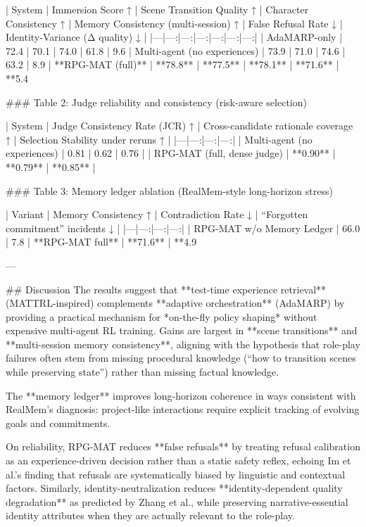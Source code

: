 | System | Immersion Score ↑ | Scene Transition Quality ↑ | Character Consistency ↑ | Memory Consistency (multi-session) ↑ | False Refusal Rate ↓ | Identity-Variance (Δ quality) ↓ |
|---|---:|---:|---:|---:|---:|---:|
| AdaMARP-only | 72.4 | 70.1 | 74.0 | 61.8 | 9.6%
| Multi-agent (no experiences) | 73.9 | 71.0 | 74.6 | 63.2 | 8.9%
| **RPG-MAT (full)** | **78.8** | **77.5** | **78.1** | **71.6** | **5.4%

### Table 2: Judge reliability and consistency (risk-aware selection)  

| System | Judge Consistency Rate (JCR) ↑ | Cross-candidate rationale coverage ↑ | Selection Stability under reruns ↑ |
|---|---:|---:|---:|
| Multi-agent (no experiences) | 0.81 | 0.62 | 0.76 |
| RPG-MAT (full, dense judge) | **0.90** | **0.79** | **0.85** |

### Table 3: Memory ledger ablation (RealMem-style long-horizon stress)  

| Variant | Memory Consistency ↑ | Contradiction Rate ↓ | “Forgotten commitment” incidents ↓ |
|---|---:|---:|---:|
| RPG-MAT w/o Memory Ledger | 66.0 | 7.8%
| **RPG-MAT full** | **71.6** | **4.9%

---

## Discussion  
The results suggest that **test-time experience retrieval** (MATTRL-inspired) complements **adaptive orchestration** (AdaMARP) by providing a practical mechanism for *on-the-fly policy shaping* without expensive multi-agent RL training. Gains are largest in **scene transitions** and **multi-session memory consistency**, aligning with the hypothesis that role-play failures often stem from missing procedural knowledge (“how to transition scenes while preserving state”) rather than missing factual knowledge.

The **memory ledger** improves long-horizon coherence in ways consistent with RealMem’s diagnosis: project-like interactions require explicit tracking of evolving goals and commitments.  

On reliability, RPG-MAT reduces **false refusals** by treating refusal calibration as an experience-driven decision rather than a static safety reflex, echoing Im et al.’s finding that refusals are systematically biased by linguistic and contextual factors. Similarly, identity-neutralization reduces **identity-dependent quality degradation** as predicted by Zhang et al., while preserving narrative-essential identity attributes when they are actually relevant to the role-play.

